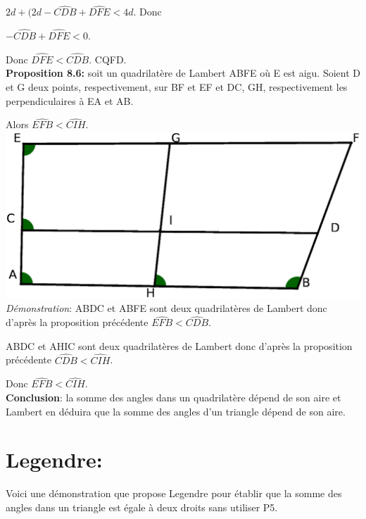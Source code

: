 \documentclass[a4paper, 12pt, twoside]{book}
\begin{document}
   $2d +(2d -\hat{CDB}+\hat{DFE}<4d$. Donc\
    
   $-\hat{CDB}+\hat{DFE}<0$.\
   
    Donc $\hat{DFE}<\hat{CDB}$. CQFD.\\
  
   \textbf{Proposition 8.6:} soit un quadrilatère de Lambert ABFE où E est aigu. Soient D et G deux points, respectivement, sur BF et EF et DC, GH, respectivement les perpendiculaires à EA et AB.\
  
  Alors $\hat{EFB}<\hat{CIH}$.\\
   
   
   
     
  
   \includegraphics[scale=0.4]{figures/Lambert5.eps} \\
  
  
  \textit{Démonstration}: ABDC et ABFE sont deux quadrilatères de Lambert donc d'après la proposition précédente $\hat{EFB}<\hat{CDB}$. \
 
  ABDC et AHIC sont deux quadrilatères de Lambert donc d'après la proposition précédente $\hat{CDB}<\hat{CIH}$.\
  
  Donc $\hat{EFB}<\hat{CIH}$.\\
  
  
  \textbf{Conclusion}: la somme des angles dans un quadrilatère dépend de son aire et Lambert en déduira que la somme des angles d'un triangle dépend de son aire.
  
  
  \chapter{Legendre:}
  
  
  
  
  Voici une démonstration que propose Legendre pour établir que la somme des angles dans un triangle est égale à deux droits sans utiliser P5.\\
  
\end{document}
